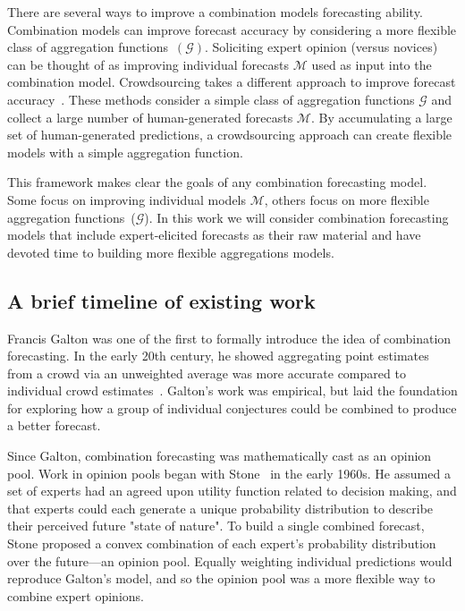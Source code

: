 \documentclass[preprint]{elsarticle}
\begin{document}
There are several ways to improve a combination models forecasting ability.
Combination models can improve forecast accuracy by considering a more flexible class of aggregation functions~$(\mathcal{G})$.
Soliciting expert opinion (versus novices) can be thought of as improving individual forecasts $\mathcal{M}$ used as input into the combination model.
Crowdsourcing takes a different approach to improve forecast accuracy~\cite{howe2006rise,brabham2013crowdsourcing,abernethy2011collaborative,forlines2014crowdsourcing,moran2016epidemic}. 
These methods consider a simple class of aggregation functions $\mathcal{G}$ and collect a large number of human-generated forecasts $\mathcal{M}$.
By accumulating a large set of human-generated predictions, a crowdsourcing approach can create flexible models with a simple aggregation function.

This framework makes clear the goals of any combination forecasting model.
Some focus on improving individual models $\mathcal{M}$, others focus on more flexible aggregation functions~($\mathcal{G}$).
In this work we will consider combination forecasting models that include expert-elicited forecasts as their raw material and have devoted time to building more flexible aggregations models.

\subsection{A brief timeline of existing work}

Francis Galton was one of the first to formally introduce the idea of combination forecasting. 
In the early 20th century, he showed aggregating point estimates from a crowd via an unweighted average was more accurate compared to individual crowd estimates~\cite{galton1907vox}.
Galton's work was empirical, but laid the foundation for exploring how a group of individual conjectures could be combined to produce a better forecast. 

Since Galton, combination forecasting was mathematically cast as an opinion pool.
Work in opinion pools began with Stone~\cite{stone1961opinion} in the early 1960s.
He assumed a set of experts had an agreed upon utility function related to decision making, and that experts could each generate a unique probability distribution to describe their perceived future "state of nature".
To build a single combined forecast, Stone proposed a convex combination of each expert's probability distribution over the future---an opinion pool.
Equally weighting individual predictions would reproduce Galton's model, and so the opinion pool was a more flexible way to combine expert opinions.
\end{document}
